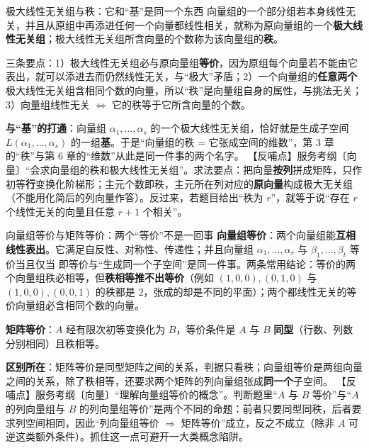 \begin{fdeep}{极大线性无关组与秩：它和“基”是同一个东西}
向量组的一个部分组若本身线性无关，并且从原组中再添进任何一个向量都线性相关，就称为原向量组的一个\textbf{极大线性无关组}；极大线性无关组所含向量的个数称为该向量组的\textbf{秩}。

三条要点：1）极大线性无关组必与原向量组\textbf{等价}，因为原组每个向量若不能由它表出，就可以添进去而仍然线性无关，与“极大”矛盾；2）一个向量组的\textbf{任意两个}极大线性无关组含相同个数的向量，所以“秩”是向量组自身的属性，与挑法无关；3）向量组线性无关 $\iff$ 它的秩等于它所含向量的个数。

\textbf{与“基”的打通}：向量组 $\alpha_1,\dots,\alpha_s$ 的一个极大线性无关组，恰好就是生成子空间 $L(\alpha_1,\dots,\alpha_s)$ 的一组\textbf{基}。于是“向量组的秩 = 它张成空间的维数”，第 3 章的“秩”与第 6 章的“维数”从此是同一件事的两个名字。
【反哺点】服务考纲〔向量〕“会求向量组的秩和极大线性无关组”。求法要点：把向量\textbf{按列}拼成矩阵，只作初等\textbf{行}变换化阶梯形；主元个数即秩，主元所在列对应的\textbf{原向量}构成极大无关组（不能用化简后的列向量作答）。反过来，若题目给出“秩为 $r$”，就等于说“存在 $r$ 个线性无关的向量且任意 $r+1$ 个相关”。
\end{fdeep}

\begin{fdeep}{向量组等价与矩阵等价：两个“等价”不是一回事}
\textbf{向量组等价}：两个向量组能\textbf{互相线性表出}。它满足自反性、对称性、传递性；并且向量组 $\alpha_1,\dots,\alpha_r$ 与 $\beta_1,\dots,\beta_t$ 等价当且仅当
即等价与“生成同一个子空间”是同一件事。两条常用结论：等价的两个向量组秩必相等，但\textbf{秩相等推不出等价}（例如 $(1,0,0),(0,1,0)$ 与 $(1,0,0),(0,0,1)$ 的秩都是 $2$，张成的却是不同的平面）；两个都线性无关的等价向量组必含相同个数的向量。

\textbf{矩阵等价}：$A$ 经有限次初等变换化为 $B$，等价条件是 $A$ 与 $B$ \textbf{同型}（行数、列数分别相同）且秩相等。

\textbf{区别所在}：矩阵等价是同型矩阵之间的关系，判据只看秩；向量组等价是两组向量之间的关系，除了秩相等，还要求两个矩阵的列向量组张成\textbf{同一个}子空间。
【反哺点】服务考纲〔向量〕“理解向量组等价的概念”。判断题里“$A$ 与 $B$ 等价”与“$A$ 的列向量组与 $B$ 的列向量组等价”是两个不同的命题：前者只要同型同秩，后者要求列空间相同，因此“列向量组等价 $\Longrightarrow$ 矩阵等价”成立，反之不成立（除非 $A$ 可逆这类额外条件）。抓住这一点可避开一大类概念陷阱。
\end{fdeep}

